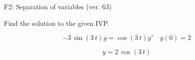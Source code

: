 \begin{exercise}
  \begin{exerciseTitle}F2: Separation of variables (ver. 63)\end{exerciseTitle}
  \begin{exerciseStatement}
    
Find the solution to the given IVP.

    
\[-3 \, \sin\left(3 \, t\right) y= \cos\left(3 \, t\right) y'\hspace{1em} y\left( 0 \right)= 2\]

  \end{exerciseStatement}
  \begin{exerciseAnswer}
    
\[y= 2 \, \cos\left(3 \, t\right)\]

  \end{exerciseAnswer}
\end{exercise}